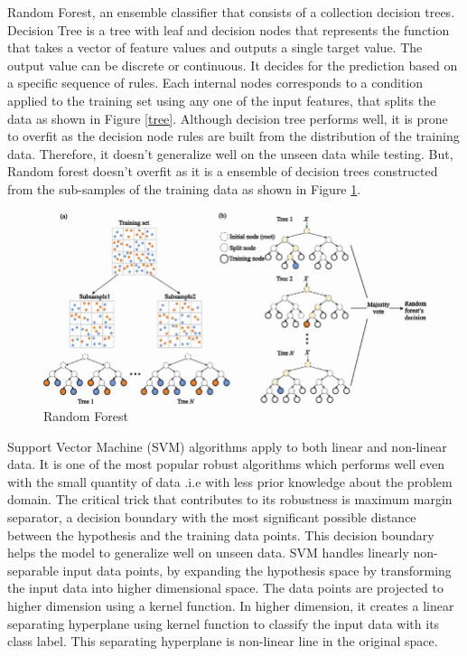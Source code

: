 \documentclass[12pt]{report} %
\begin{document}
Random Forest, an ensemble classifier that consists of a collection decision trees. Decision Tree is a tree with leaf and decision nodes that represents the function that takes a vector of feature values and outputs a single target value. The output value can be discrete or continuous. It decides for the prediction based on a specific sequence of rules. Each internal nodes corresponds to a condition applied to the training set using any one of the input features, that splits the data as shown in Figure \ref{tree}. Although decision tree performs well, it is prone to overfit as the decision node rules are built from the distribution of the training data. Therefore, it doesn't generalize well on the unseen data while testing. But, Random forest doesn't overfit as it is a ensemble of decision trees constructed from the sub-samples of the training data as shown in Figure \ref{rf}. 

\begin{figure}[!tbp]
	\centering
	\caption{Random Forest}
	\label{rf}
	\includegraphics[scale=0.40]{image/rf.jpg}
\end{figure}

Support Vector Machine (SVM) algorithms apply to both linear and non-linear data. It is one of the most popular robust algorithms which performs well even with the small quantity of data .i.e with less prior knowledge about the problem domain. The critical trick that contributes to its robustness is maximum margin separator, a decision boundary with the most significant possible distance between the hypothesis and the training data points. This decision boundary helps the model to generalize well on unseen data. SVM handles linearly non-separable input data points, by expanding the hypothesis space by transforming the input data into higher dimensional space. The data points are projected to higher dimension using a kernel function. In higher dimension, it creates a linear separating hyperplane using kernel function to classify the input data with its class label. This separating hyperplane is non-linear line in the original space. 
\end{document}
